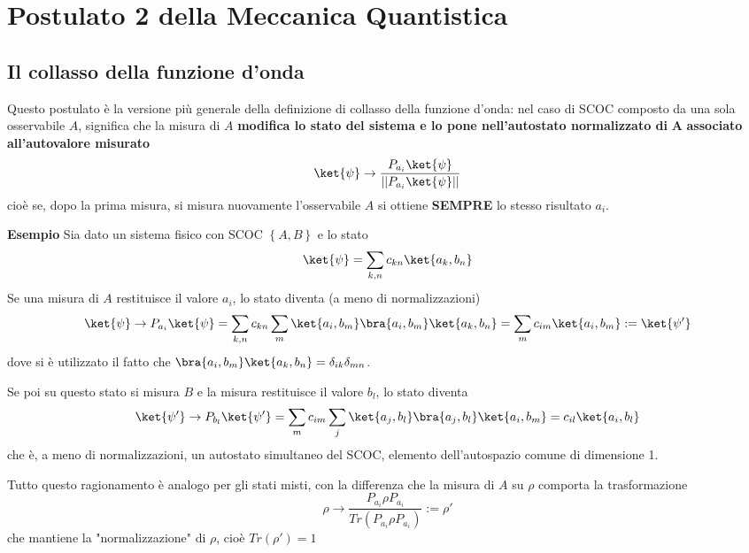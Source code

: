 \section{Postulato 2 della Meccanica Quantistica}
\noindent{}
\subsection{Il collasso della funzione d'onda}

Questo postulato è la versione più generale della definizione di collasso della funzione d'onda:
nel caso di SCOC composto da una sola osservabile $A$, significa che la misura di $A$ \textbf{modifica lo
stato del sistema e lo pone nell'autostato normalizzato di} $\mathbf{A}$ \textbf{associato all'autovalore
misurato}
$$\ket{\psi}\rightarrow \frac{P_{a_i}\ket{\psi}}{\left|\left| P_{a_i}\ket{\psi} \right|\right|}$$
cioè se, dopo la prima misura, si misura nuovamente l'osservabile $A$ si ottiene \textbf{SEMPRE} lo stesso
risultato $a_i$.


\textbf{Esempio} Sia dato un sistema fisico con SCOC $\left\{A,B\right\}$ e lo stato 
$$\ket{\psi} = \sum_{k,n} c_{kn}\ket{a_k,b_n}$$
Se una misura di $A$ restituisce il valore $a_i$, lo stato diventa (a meno di normalizzazioni)
$$\ket{\psi}\rightarrow P_{a_i}\ket{\psi}=
\sum_{k,n}c_{kn}\sum_{m}\ket{a_i,b_m}\bra{a_i,b_m}\ket{a_k,b_n} = \sum_{m}c_{im}\ket{a_i,b_m}:=\ket{\psi'}
$$
dove si è utilizzato il fatto che $\bra{a_i,b_m}\ket{a_k,b_n} = \delta_{ik}\delta_{mn}$.

Se poi su questo stato si misura $B$ e la misura restituisce il valore $b_l$, lo stato diventa
$$\ket{\psi'} \rightarrow P_{b_l}\ket{\psi'} =
\sum_{m}c_{im}\sum_{j}\ket{a_j,b_l}\bra{a_j,b_l}\ket{a_i,b_m} = c_{il}\ket{a_i,b_l}$$
che è, a meno di normalizzazioni, un autostato simultaneo del SCOC, elemento dell'autospazio comune di 
dimensione 1.

Tutto questo ragionamento è analogo per gli stati misti, con la differenza che la misura di $A$ su $\rho$
comporta la trasformazione
$$\rho\rightarrow \frac{P_{a_i}\rho P_{a_i}}{Tr\left(P_{a_i}\rho P_{a_i}\right)}:=\rho'$$
che mantiene la "normalizzazione" di $\rho$, cioè $Tr(\rho')=1$

